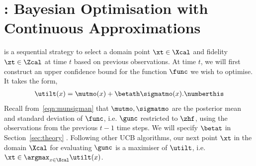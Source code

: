 
\section{\mfgpucbtwo: Bayesian Optimisation with Continuous Approximations}
\label{sec:mfgpucb}

\mfgpucbtwos is a sequential strategy to select a domain point $\xt\in\Xcal$ and
fidelity $\zt\in\Zcal$ at time $t$ based on previous observations.
At time $t$, we will first
construct an upper confidence bound for the function $\func$ we wish to optimise.
It takes the form,
\begin{align*}
\utilt(x) = \mutmo(x) + \betath \sigmatmo(x).
\numberthis
\label{eqn:mfucb}
\end{align*}
Recall from~\eqref{eqn:munsigman} that $\mutmo,\sigmatmo$ are the posterior mean and
standard deviation of $\func$,
i.e. $\gunc$ restricted to $\zhf$, using the observations from the previous $t-1$ time
steps.
We will specify $\betat$ in Section~\ref{sec:theory} .
Following other UCB algorithms, our next point $\xt$ in the domain $\Xcal$ for evaluating
$\gunc$ is a maximiser of $\utilt$, i.e. $\xt \in \argmax_{x\in\Xcal} \utilt(x)$.

